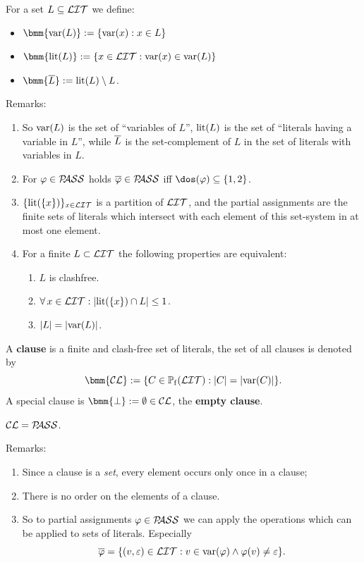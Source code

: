 \documentclass[12pt]{book}
\begin{document}
\begin{defi}\label{def:clauses}
  For a set $L \subseteq \mathcal{LIT}$ we define:
  \begin{itemize}
  \item $\bmm{\var(L)} := \set{\var(x) : x \in L}$
  \item $\bmm{\lit(L)} := \set{x \in \Lit : \var(x) \in \var(L)}$
  \item $\bmm{\ol{L}} := \lit(L) \sm L$.
  \end{itemize}
\end{defi}
Remarks:
\begin{enumerate}
\item So $\operatorname{var}(L)$ is the set of ``variables of $L$'', $\operatorname{lit}(L)$ is the set of ``literals having a variable in $L$'', while $\overline{L}$ is the set-complement of $L$ in the set of literals with variables in $L$.
\item For $\varphi \in \mathcal{P\hspace{-0.32em}ASS}$ holds $\overline{\varphi} \in \mathcal{P\hspace{-0.32em}ASS}$ iff $\dos(\vp) \sse \set{1,2}$.
\item $\{ \operatorname{lit}(\{ x \}) \}_{x \in \mathcal{LIT}}$ is a partition of $\mathcal{LIT}$, and the partial assignments are the finite sets of literals which intersect with each element of this set-system in at most one element.
\item For a finite $L \subset \mathcal{LIT}$ the following properties are equivalent:
  \begin{enumerate}
  \item $L$ is clashfree.
  \item $\forall\, x \in \mathcal{LIT} : \lvert \operatorname{lit}(\{ x \}) \cap L \rvert \le 1$.
  \item $\lvert L \rvert = \lvert \operatorname{var}(L) \rvert$.
  \end{enumerate}
\end{enumerate}


\begin{defi}\label{def:cl}
  A \textbf{clause} is a finite and clash-free set of literals, the set of all clauses is denoted by
  \begin{displaymath}
    \bmm{\Cl} := \set{C \in \pote(\Lit) : \abs{C} = \abs{\var(C)}}.
  \end{displaymath}
  A special clause is $\bmm{\bot} := \es \in \Cl$, the \textbf{empty clause}.
\end{defi}

\begin{lem}\label{lem::CLPASS}
  $\mathcal{CL} = \mathcal{P\hspace{-0.32em}ASS}$.
\end{lem}
Remarks:
\begin{enumerate}
\item Since a clause is a \textit{set}, every element occurs only once in a clause;
\item There is no order on the elements of a clause.
\item So to partial assignments $\varphi \in \mathcal{P\hspace{-0.32em}ASS}$ we can apply the operations which can be applied to sets of literals. Especially
  \begin{displaymath}
    \overline{\varphi} = \{ (v,\varepsilon) \in \mathcal{LIT} : v \in \operatorname{var}(\varphi) \wedge \varphi(v) \ne \varepsilon \}.
  \end{displaymath}
\end{enumerate}
\end{document}
